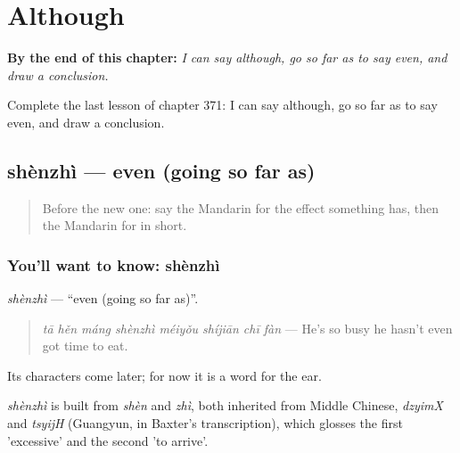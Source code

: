 
\chapter{Although}
\label{ch:zh-although}

\begin{chapteropening}
\textbf{By the end of this chapter:} \emph{I can say although, go so far as to say even, and draw a conclusion.}

Complete the last lesson of chapter 371: I can say although, go so far as to say even, and draw a conclusion.
\end{chapteropening}

\section[shènzhì]{shènzhì — even (going so far as)}

\label{lesson:ZH-C371-shenzhi}



\begin{quote}
Before the new one: say the Mandarin for the effect something has, then the Mandarin for in short.
\end{quote}

\subsection*{You'll want to know: shènzhì}
\emph{shènzhì} — \textquotedblleft{}even (going so far as)\textquotedblright{}.

\begin{quote}
\emph{tā hěn máng shènzhì méiyǒu shíjiān chī fàn} — He's so busy he hasn't even got time to eat.
\end{quote}

Its characters come later; for now it is a word for the ear.

\begin{cousinweb}
\emph{shènzhì} is built from \emph{shèn} and \emph{zhì}, both inherited from Middle Chinese, \emph{dzyimX} and \emph{tsyijH} (Guangyun, in Baxter's transcription), which glosses the first 'excessive' and the second 'to arrive'.
\end{cousinweb}

